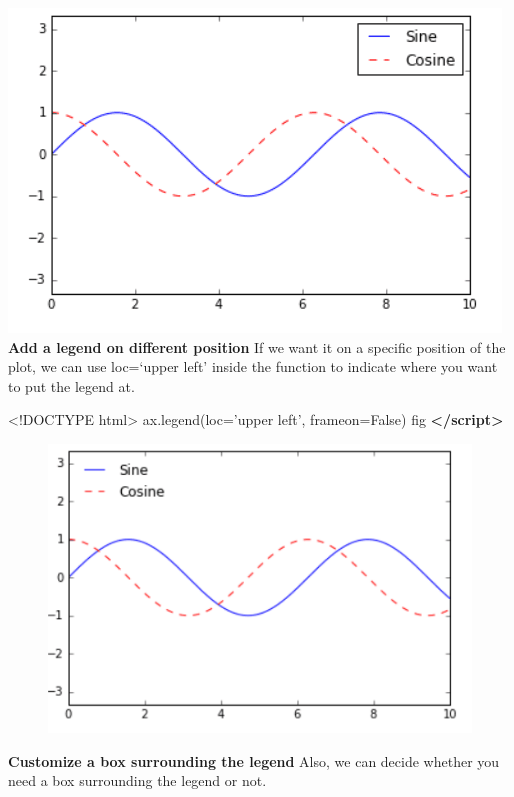 \documentclass[]{book}
\newenvironment{Shaded}{\begin{snugshade}}{\end{snugshade}}
\newcommand{\KeywordTok}[1]{\textcolor[rgb]{0.13,0.29,0.53}{\textbf{#1}}}
\newcommand{\DataTypeTok}[1]{\textcolor[rgb]{0.13,0.29,0.53}{#1}}
\newcommand{\NormalTok}[1]{#1}
\begin{document}
\includegraphics{images/legend1.png} \textbf{Add a legend on different
position} If we want it on a specific position of the plot, we can use
loc=`upper left' inside the function to indicate where you want to put
the legend at.

\begin{Shaded}
\begin{Highlighting}[]
\DataTypeTok{<!DOCTYPE }\NormalTok{html}\DataTypeTok{>}
\NormalTok{ax.legend(loc='upper left', frameon=False)}
\NormalTok{fig}
\KeywordTok{</script>}
\end{Highlighting}
\end{Shaded}

\begin{figure}
\centering
\includegraphics{images/legend2.png}
\caption{}
\end{figure}

\textbf{Customize a box surrounding the legend} Also, we can decide
whether you need a box surrounding the legend or not.
\end{document}

